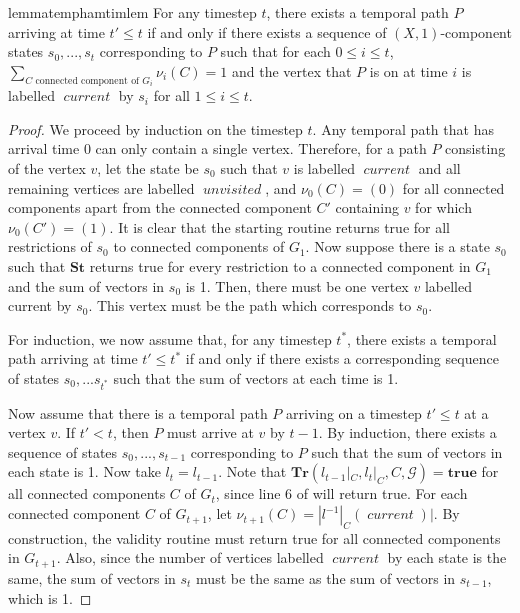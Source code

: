 \documentclass[a4paper,UKenglish,cleveref, autoref, thm-restate]{lipics-v2021} %
\DeclareMathOperator{\unvisited}{\textit{unvisited}}
\DeclareMathOperator{\current}{\textit{current}}
\begin{document}
\begin{toappendix}
\begin{restatable}{lemma}{temphamtimlem}\label{lem:temp-ham-tim}
    For any timestep $t$, there exists a temporal path $P$ arriving at time $t' \leq t$ if and only if there exists a sequence of $(X,1)$-component states $s_0, ... ,s_t$ corresponding to $P$ such that for each $0\leq i\leq t$, $\sum_{C\text{ connected component of }G_i}\nu_i(C)= 1$ and the vertex that $P$ is on at time $i$ is labelled $\current$ by $s_i$ for all $1\leq i\leq t$.
    \end{restatable}
    \begin{proof}
    We proceed by induction on the timestep $t$. Any temporal path that has arrival time $0$ can only contain a single vertex. Therefore, for a path $P$ consisting of the vertex $v$, let the state be $s_0$ such that $v$ is labelled $\current$ and all remaining vertices are labelled $\unvisited$, and $\nu_0(C)=(0)$ for all connected components apart from the connected component $C'$ containing $v$ for which $\nu_0(C')=(1)$. It is clear that the starting routine returns true for all restrictions of $s_0$ to connected components of $G_1$. Now suppose there is a state $s_0$ such that $\textbf{St}$ returns true for every restriction to a connected component in $G_1$ and the sum of vectors in $s_0$ is 1. Then, there must be one vertex $v$ labelled current by $s_0$. This vertex must be the path which corresponds to $s_0$. 

    For induction, we now assume that, for any timestep $t^*$, there exists a temporal path arriving at time $t' \leq t^*$ if and only if there exists a corresponding sequence of states $s_0, ... s_{t^*}$ such that the sum of vectors at each time is 1.
    
    Now assume that there is a temporal path $P$ arriving on a timestep $t' \leq t$ at a vertex $v$. If $t' < t$, then $P$ must arrive at $v$ by $t-1$. By induction, there exists a sequence of states $s_0, ..., s_{t-1}$ corresponding to $P$ such that the sum of vectors in each state is 1. Now take $l_t = l_{t-1}$. Note that $\textbf{Tr}(l_{t-1}|_C, l_t|_C, C,\mathcal{G})=\textbf{true}$ for all connected components $C$ of $G_t$, since line 6 of  will return true. For each connected component $C$ of $G_{t+1}$, let $\nu_{t+1}(C)=|l^{-1}|_C(\current)|$. By construction, the validity routine must return true for all connected components in $G_{t+1}$. Also, since the number of vertices labelled $\current$ by each state is the same, the sum of vectors in $s_t$ must be the same as the sum of vectors in $s_{t-1}$, which is 1. 
    

\end{proof}
\end{toappendix}
\end{document}
